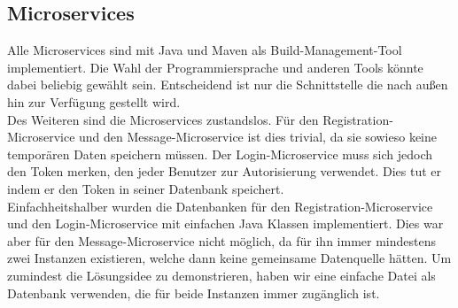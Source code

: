 \subsection{Microservices}
Alle Microservices sind mit Java und Maven als Build-Management-Tool implementiert. Die Wahl der Programmiersprache und anderen Tools könnte dabei beliebig gewählt sein. Entscheidend ist nur die Schnittstelle die nach außen hin zur Verfügung gestellt wird.\\
Des Weiteren sind die Microservices zustandslos. Für den Registration-Microservice und den Message-Microservice ist dies trivial, da sie sowieso keine temporären Daten speichern müssen. Der Login-Microservice muss sich jedoch den Token merken, den jeder Benutzer zur Autorisierung verwendet. Dies tut er indem er den Token in seiner Datenbank speichert.\\
Einfachheitshalber wurden die Datenbanken für den Registration-Microservice und den Login-Microservice mit einfachen Java Klassen implementiert. Dies war aber für den Message-Microservice nicht möglich, da für ihn immer mindestens zwei Instanzen existieren, welche dann keine gemeinsame Datenquelle hätten. Um zumindest die Lösungsidee zu demonstrieren, haben wir eine einfache Datei als Datenbank verwenden, die für beide Instanzen immer zugänglich ist.